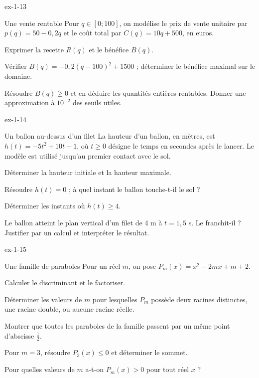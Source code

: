 \begin{blocLivre}{ex-1-13}
\begin{exercice}[3]{Une vente rentable}
Pour $q\in[0;100]$, on modélise le prix de vente unitaire par $p(q)=50-0{,}2q$
et le coût total par $C(q)=10q+500$, en euros.
\begin{questions}
\item Exprimer la recette $R(q)$ et le bénéfice $B(q)$.
\item Vérifier $B(q)=-0{,}2(q-100)^2+1500$ ; déterminer le bénéfice maximal sur le domaine.
\item Résoudre $B(q)\geq0$ et en déduire les quantités entières rentables. Donner une approximation à $10^{-2}$ des seuils utiles.
\end{questions}
\end{exercice}
\end{blocLivre}
\begin{blocLivre}{ex-1-14}
\begin{exercice}[3]{Un ballon au-dessus d'un filet}
La hauteur d'un ballon, en mètres, est $h(t)=-5t^2+10t+1$,
où $t\geq0$ désigne le temps en secondes après le lancer.
Le modèle est utilisé jusqu'au premier contact avec le sol.
\begin{questions}
\item Déterminer la hauteur initiale et la hauteur maximale.
\item Résoudre $h(t)=0$ ; à quel instant le ballon touche-t-il le sol ?
\item Déterminer les instants où $h(t)\geq4$.
\item Le ballon atteint le plan vertical d'un filet de 4 m à $t=1{,}5$ s.
Le franchit-il ? Justifier par un calcul et interpréter le résultat.
\end{questions}
\label{figlivre-r01-14-ballon-ex}

\end{exercice}
\end{blocLivre}
\begin{blocLivre}{ex-1-15}
\begin{exercice}[3]{Une famille de paraboles}
Pour un réel $m$, on pose $P_m(x)=x^2-2mx+m+2$.
\begin{questions}
\item Calculer le discriminant et le factoriser.
\item Déterminer les valeurs de $m$ pour lesquelles $P_m$ possède deux racines distinctes,
une racine double, ou aucune racine réelle.
\end{questions}
\begin{questions}[resume]
\item Montrer que toutes les paraboles de la famille passent par un même point d'abscisse $\frac12$.
\item Pour $m=3$, résoudre $P_3(x)\leq0$ et déterminer le sommet.
\item Pour quelles valeurs de $m$ a-t-on $P_m(x)>0$ pour tout réel $x$ ?
\end{questions}
\end{exercice}
\end{blocLivre}
